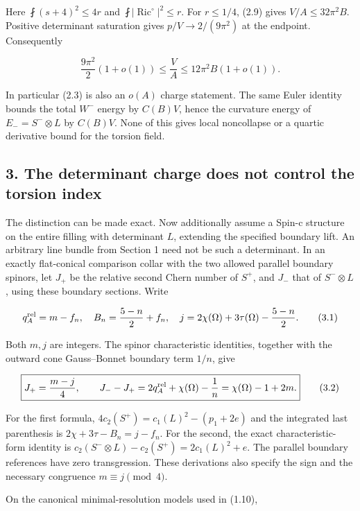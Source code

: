 \documentclass[
  11pt,
]{article}
\begin{document}
Here \(\fint(s+4)^2\le4r\) and
\(\fint|\operatorname{Ric}^{\circ}|^2\le r\). For \(r\le1/4\), (2.9)
gives \(V/A\le32\pi^2B\). Positive determinant saturation gives
\(p/V\to2/(9\pi^2)\) at the endpoint. Consequently

\[
 \frac{9\pi^2}{2}(1+o(1))\le\frac VA
                         \le12\pi^2B(1+o(1)).
 \tag{2.10}
\]

In particular (2.3) is also an \(o(A)\) charge statement. The same Euler
identity bounds the total \(W^-\) energy by \(C(B)V\), hence the
curvature energy of \(E_-=S^-\otimes L\) by \(C(B)V\). None of this
gives local noncollapse or a quartic derivative bound for the torsion
field.

\hypertarget{the-determinant-charge-does-not-control-the-torsion-index}{%
\subsection{3. The determinant charge does not control the torsion
index}\label{the-determinant-charge-does-not-control-the-torsion-index}}

The distinction can be made exact. Now additionally assume a Spin-c
structure on the entire filling with determinant \(L\), extending the
specified boundary lift. An arbitrary line bundle from Section 1 need
not be such a determinant. In an exactly flat-conical comparison collar
with the two allowed parallel boundary spinors, let \(J_+\) be the
relative second Chern number of \(S^+\), and \(J_-\) that of
\(S^-\otimes L\), using these boundary sections. Write

\[
 q_A^{\rm rel}=m-f_n,\quad
 B_n=\frac{5-n}{2}+f_n,\quad
 j=2\chi(\Omega)+3\tau(\Omega)-\frac{5-n}{2}.
 \tag{3.1}
\]

Both \(m,j\) are integers. The spinor characteristic identities,
together with the outward cone Gauss--Bonnet boundary term \(1/n\), give

\[
 \boxed{J_+=\frac{m-j}{4},\qquad
        J_--J_+=2q_A^{\rm rel}+\chi(\Omega)-\frac1n
                    =\chi(\Omega)-1+2m.}
 \tag{3.2}
\]

For the first formula, \(4c_2(S^+)=c_1(L)^2-(p_1+2e)\) and the
integrated last parenthesis is \(2\chi+3\tau-B_n=j-f_n\). For the
second, the exact characteristic-form identity is
\(c_2(S^-\otimes L)-c_2(S^+)=2c_1(L)^2+e\). The parallel boundary
references have zero transgression. These derivations also specify the
sign and the necessary congruence \(m\equiv j\pmod4\).

On the canonical minimal-resolution models used in (1.10),
\end{document}
